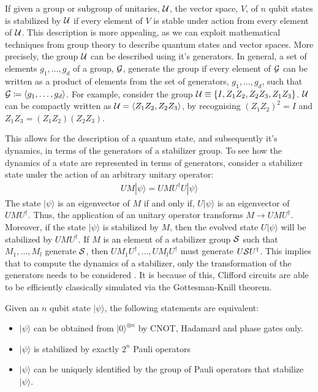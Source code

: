 If given a group or subgroup of unitaries, $\cal U$, the vector space, $V$, of $n$ qubit states is
stabilized by $\cal U$ if every element of $V$ is stable under action from every element of $\cal U$.
This description is more appealing, as we can exploit mathematical techniques from group theory to
describe quantum states and vector spaces. More precisely, the group $\cal U$ can be described using it's
generators. In general, a set of elements  $g_1, \dots, g_d$ of a group, $\cal G$, generate the group
if every element of $\cal G$ can be written as a product of elements from the set of generators,
$g_1, \dots, g_d$, such that ${\cal G} \coloneqq \langle g_1, \dots, g_d\rangle$. For example,
consider the group ${\cal U} \equiv \{ I, Z_1Z_2, Z_2Z_3, Z_1Z_3\}$. ${\cal U}$ can be compactly written
as ${\cal U} = \langle Z_1Z_2, Z_2Z_3 \rangle$, by recognising $(Z_1Z_2)^2 = I$ and
$Z_1Z_3 = (Z_1Z_2)(Z_2Z_3)$.

This allows for the description of a quantum state, and subsequently it's dynamics, in terms of the generators
of a stabilizer group. To see how the dynamics of a state are represented in terms of generators, consider
a stabilizer state under the action of an arbitrary unitary operator:
\begin{align}
    UM|\psi \rangle =  UMU^{\dagger}U|\psi\rangle
\end{align}
The state $|\psi \rangle$ is an eigenvector of $M$ if and only if, $U |\psi\rangle$ is an
eigenvector of $UMU^{\dagger}$. Thus, the application of an unitary operator transforms
$M \to UMU^{\dagger}$. Moreover, if the state $|\psi \rangle$ is stabilized by $M$, then the evolved
state $U|\psi\rangle$ will be stabilized by $UMU^{\dagger}$. If $M$ is an element of a stabilizer group
$\cal S$ such that $M_1, \dots, M_l$ generate $\cal S$, then $UM_1U^{\dagger}, \dots, UM_lU^{\dagger}$ must generate
$U{\cal S}U^{\dagger}$. This implies that to compute the dynamics of a stabilizer, only the transformation of
the generators needs to be considered \cite{fault-tolerantQC}. It is because of this,
Clifford circuits are able to be efficiently classically simulated via the Gottesman-Knill theorem.
\begin{theorem}

    Given an $n$ qubit state $|\psi \rangle$, the following statements are equivalent:
    \begin{itemize}
        \item $|\psi \rangle$ can be obtained from $|0 \rangle^{\otimes n}$ by CNOT, Hadamard and phase gates only.
        \item $|\psi \rangle$ is stabilized by exactly $2^n$ Pauli operators
        \item $|\psi \rangle$ can be uniquely identified by the group of Pauli operators that
              stabilize $|\psi \rangle$.
    \end{itemize}
\end{theorem}

